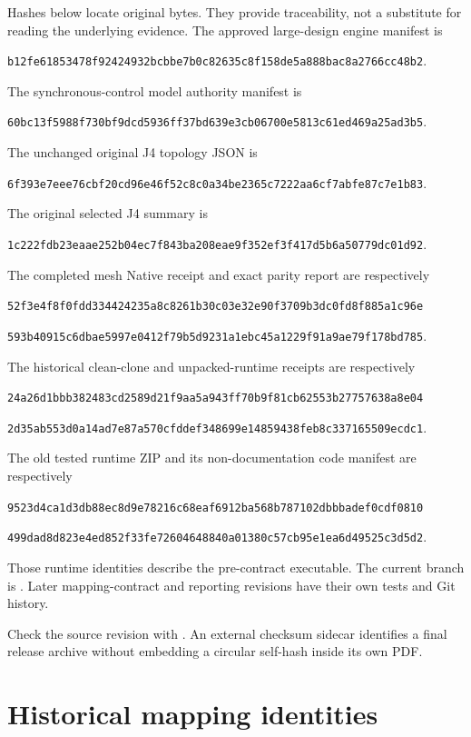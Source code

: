 \documentclass[11pt]{article}
\newcommand{\code}[1]{\texttt{\detokenize{#1}}}
\newcommand{\sha}[1]{{\scriptsize\texttt{#1}}}
\begin{document}
Hashes below locate original bytes. They provide traceability, not a substitute for reading the underlying evidence. The approved large-design engine manifest is
\begin{center}\sha{b12fe61853478f92424932bcbbe7b0c82635c8f158de5a888bac8a2766cc48b2}.\end{center}
The synchronous-control model authority manifest is
\begin{center}\sha{60bc13f5988f730bf9dcd5936ff37bd639e3cb06700e5813c61ed469a25ad3b5}.\end{center}
The unchanged original J4 topology JSON is
\begin{center}\sha{6f393e7eee76cbf20cd96e46f52c8c0a34be2365c7222aa6cf7abfe87c7e1b83}.\end{center}
The original selected J4 summary is
\begin{center}\sha{1c222fdb23eaae252b04ec7f843ba208eae9f352ef3f417d5b6a50779dc01d92}.\end{center}
The completed mesh Native receipt and exact parity report are respectively
\begin{center}\sha{52f3e4f8f0fdd334424235a8c8261b30c03e32e90f3709b3dc0fd8f885a1c96e}\par
\sha{593b40915c6dbae5997e0412f79b5d9231a1ebc45a1229f91a9ae79f178bd785}.\end{center}
The historical clean-clone and unpacked-runtime receipts are respectively
\begin{center}\sha{24a26d1bbb382483cd2589d21f9aa5a943ff70b9f81cb62553b27757638a8e04}\par
\sha{2d35ab553d0a14ad7e87a570cfddef348699e14859438feb8c337165509ecdc1}.\end{center}
The old tested runtime ZIP and its non-documentation code manifest are respectively
\begin{center}\sha{9523d4ca1d3db88ec8d9e78216c68eaf6912ba568b787102dbbbadef0cdf0810}\par
\sha{499dad8d823e4ed852f33fe72604648840a01380c57cb95e1ea6d49525c3d5d2}.\end{center}
Those runtime identities describe the pre-contract executable. The current branch is . Later mapping-contract and reporting revisions have their own tests and Git history.

Check the source revision with \code{git rev-parse HEAD}. An external checksum sidecar identifies a final release archive without embedding a circular self-hash inside its own PDF.

\section{Historical mapping identities}
\end{document}
